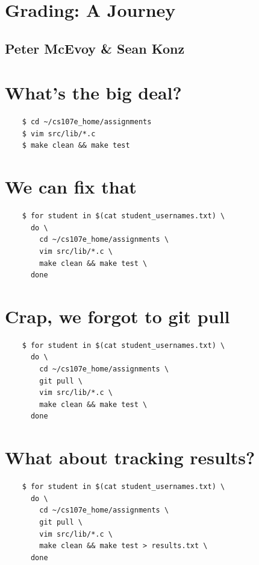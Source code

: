 \documentclass{article}
\begin{document}
\section*{Grading: A Journey}
\subsection*{Peter McEvoy \& Sean Konz}

\newpage

\section*{What's the big deal?}
\vspace{2ex}
\begin{verbatim}
    $ cd ~/cs107e_home/assignments
    $ vim src/lib/*.c
    $ make clean && make test
\end{verbatim}

\newpage

\section*{We can fix that}
\vspace{2ex}
\begin{verbatim}
    $ for student in $(cat student_usernames.txt) \
      do \
        cd ~/cs107e_home/assignments \
        vim src/lib/*.c \
        make clean && make test \
      done
\end{verbatim}

\newpage

\section*{Crap, we forgot to git pull}
\vspace{2ex}
\begin{verbatim}
    $ for student in $(cat student_usernames.txt) \
      do \
        cd ~/cs107e_home/assignments \
        git pull \
        vim src/lib/*.c \
        make clean && make test \
      done
\end{verbatim}

\newpage

\section*{What about tracking results?}
\vspace{2ex}
\begin{verbatim}
    $ for student in $(cat student_usernames.txt) \
      do \
        cd ~/cs107e_home/assignments \
        git pull \
        vim src/lib/*.c \
        make clean && make test > results.txt \
      done
\end{verbatim}
\end{document}
